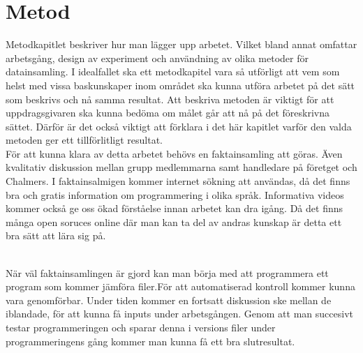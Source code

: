 \section{Metod}

Metodkapitlet beskriver hur man lägger upp arbetet. Vilket bland annat omfattar arbetsgång, design av experiment och användning av olika metoder för datainsamling. I idealfallet ska ett metodkapitel vara så utförligt att vem som helst med vissa baskunskaper inom området ska kunna utföra arbetet på det sätt som beskrivs och nå samma resultat. Att beskriva metoden är viktigt för att uppdragsgivaren ska kunna bedöma om målet går att nå på det föreskrivna sättet. Därför är det också viktigt att förklara i det här kapitlet varför den valda metoden ger ett tillförlitligt resultat.
\\[5mm]

För att kunna klara av detta arbetet behövs en faktainsamling att göras. Även kvalitativ diskussion mellan grupp medlemmarna samt handledare på företget och Chalmers. I faktainsalmigen kommer internet sökning att användas, då det finns bra och gratis information om programmering i olika språk. Informativa videos kommer också ge oss ökad förståelse innan arbetet kan dra igång. Då det finns många open soruces online där man kan ta del av andras kunskap är detta ett bra sätt att lära sig på. 

\\[5mm]
När väl faktainsamlingen är gjord kan man börja med att programmera ett program som kommer jämföra filer.För att automatiserad kontroll kommer kunna vara genomförbar. Under tiden kommer en fortsatt diskussion ske mellan de iblandade, för att kunna få inputs under arbetsgången. Genom att man succesivt testar programmeringen och sparar denna i versions filer under programmeringens gång kommer man kunna få ett bra slutresultat. 

